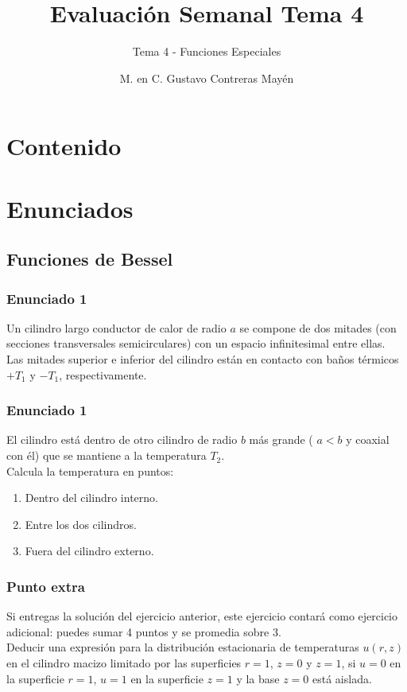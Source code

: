 \documentclass[12pt]{beamer}
\title{\large{Evaluación Semanal Tema 4}}
\subtitle{Tema 4 - Funciones Especiales}
\author{M. en C. Gustavo Contreras Mayén}
\date{}
\begin{document}
\maketitle
\fontsize{14}{14}\selectfont
{}

\section*{Contenido}

\section{Enunciados}
\subsection{Funciones de Bessel}

\begin{frame}
\frametitle{Enunciado 1}
Un cilindro largo conductor de calor de radio $a$ se compone de dos mitades (con secciones transversales semicirculares) con un espacio infinitesimal entre ellas.
\\
\bigskip
\pause
Las mitades superior e inferior del cilindro están en contacto con baños térmicos $+T_{1}$ y $-T_{1}$, respectivamente.
\end{frame}

\begin{frame}
\frametitle{Enunciado 1}
El cilindro está dentro de otro cilindro de radio $b$ más grande ( $a < b$ y coaxial con él) que se mantiene a la temperatura $T_{2}$. 
\\
\bigskip
\pause
Calcula la temperatura en puntos:
\begin{enumerate}[<+->]
\item Dentro del cilindro interno.
\item Entre los dos cilindros.
\item Fuera del cilindro externo.
\end{enumerate}
\end{frame}

\begin{frame}
\frametitle{Punto extra}
Si entregas la solución del ejercicio anterior, este ejercicio contará como ejercicio adicional: puedes sumar 4 puntos y se promedia sobre 3.
\\
\bigskip
\pause
Deducir una expresión para la distribución estacionaria de temperaturas $u(r, z)$ en el cilindro macizo limitado por las superficies $r = 1$, $z = 0$ y $z = 1$, si $u = 0$ en la superficie $r= 1$, $u = 1$ en la superficie $z = 1$ y la base $z = 0$ está aislada.
\end{frame}
\end{document}
